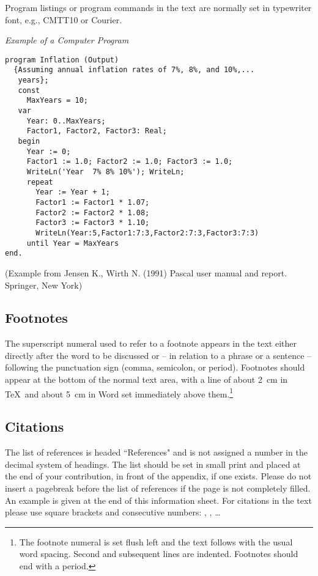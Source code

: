 \documentclass[runningheads]{llncs}
\begin{document}
Program listings or program commands in the text are normally set in
typewriter font, e.g., CMTT10 or Courier.

\medskip

\noindent
{\it Example of a Computer Program}
\begin{verbatim}
program Inflation (Output)
  {Assuming annual inflation rates of 7%, 8%, and 10%,...
   years};
   const
     MaxYears = 10;
   var
     Year: 0..MaxYears;
     Factor1, Factor2, Factor3: Real;
   begin
     Year := 0;
     Factor1 := 1.0; Factor2 := 1.0; Factor3 := 1.0;
     WriteLn('Year  7% 8% 10%'); WriteLn;
     repeat
       Year := Year + 1;
       Factor1 := Factor1 * 1.07;
       Factor2 := Factor2 * 1.08;
       Factor3 := Factor3 * 1.10;
       WriteLn(Year:5,Factor1:7:3,Factor2:7:3,Factor3:7:3)
     until Year = MaxYears
end.
\end{verbatim}
%
\noindent
{\small (Example from Jensen K., Wirth N. (1991) Pascal user manual and
report. Springer, New York)}


\subsection{Footnotes}

The superscript numeral used to refer to a footnote appears in the text
either directly after the word to be discussed or -- in relation to a
phrase or a sentence -- following the punctuation sign (comma,
semicolon, or period). Footnotes should appear at the bottom of
the
normal text area, with a line of about 2~cm in \TeX\ and about 5~cm in
Word set
immediately above them.\footnote{The footnote numeral is set flush left
and the text follows with the usual word spacing. Second and subsequent
lines are indented. Footnotes should end with a period.}

\subsection{Citations}

The list of references is headed ``References" and is not assigned a
number
in the decimal system of headings. The list should be set in small print
and placed at the end of your contribution, in front of the appendix,
if one exists.
Please do not insert a pagebreak before the list of references if the
page is not completely filled.
An example is given at the
end of this information sheet. For citations in the text please use
square brackets and consecutive numbers: \cite{leeuw},
\cite{bru:car:pier}, \cite{mich} \dots
\end{document}
